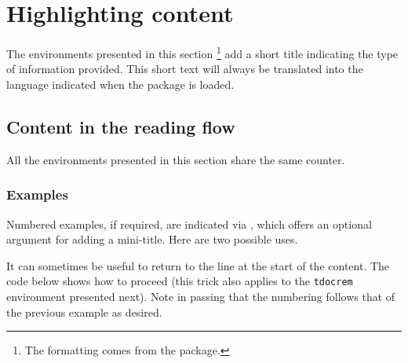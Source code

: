 \section{Highlighting content}

\begin{tdocnote}
    The environments presented in this section
    \footnote{
        The formatting comes from the  package.
    }
    add a short title indicating the type of information provided.
    This short text will always be translated into the language indicated when the \thispack{} package is loaded.
\end{tdocnote}


\subsection{Content in the reading flow}




\begin{tdocimp}
    All the environments presented in this section share the same counter.
\end{tdocimp}




\subsubsection{Examples}

Numbered examples, if required, are indicated via , which offers an optional argument for adding a mini-title.
Here are two possible uses.










\begin{tdoctip}
    It can sometimes be useful to return to the line at the start of the content. The code below shows how to proceed (this trick also applies to the \verb#tdocrem# environment presented next). Note in passing that the numbering follows that of the previous example as desired.
\end{tdoctip}

